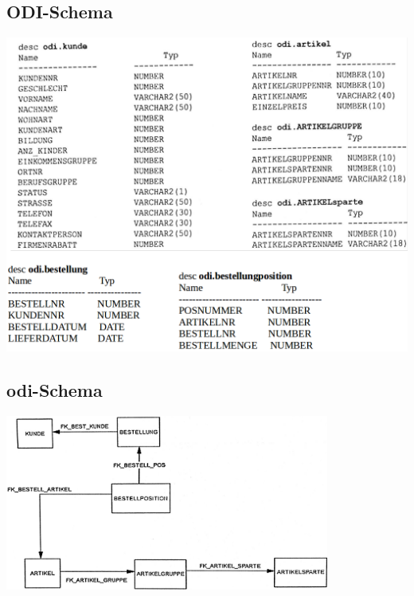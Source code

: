 \subsection{ODI-Schema}
\label{sec:schemata.odi}
\includegraphics[width=1.0\textwidth]{img/odi_schema.png}\par

\subsection{odi-Schema}
\label{sec:schemata.odi2}
\includegraphics[width=0.8\textwidth]{img/odi_schema_relations.png}\par
